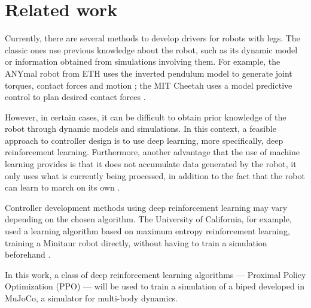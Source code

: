 






\section{Related work}

Currently, there are several methods to develop drivers for robots with legs. The classic ones use previous knowledge about the robot, such as its dynamic model or information obtained from simulations involving them. For example, the ANYmal robot from ETH uses the inverted pendulum model to generate joint torques, contact forces and motion \cite{anymal}; the MIT Cheetah uses a model predictive control to plan desired contact forces \cite{cheetah}.

However, in certain cases, it can be difficult to obtain prior knowledge of the robot through dynamic models and simulations. In this context, a feasible approach to controller design is to use deep learning, more specifically, deep reinforcement learning. Furthermore, another advantage that the use of machine learning provides is that it does not accumulate data generated by the robot, it only uses what is currently being processed, in addition to the fact that the robot can learn to march on its own \cite{haarnoja2018learning}.

Controller development methods using deep reinforcement learning may vary depending on the chosen algorithm. The University of California, for example, used a learning algorithm based on maximum entropy reinforcement learning, training a Minitaur robot directly, without having to train a simulation beforehand \cite{haarnoja2018learning}.

In this work, a class of deep reinforcement learning algorithms — Proximal Policy Optimization (PPO) — will be used to train a simulation of a biped developed in MuJoCo, a simulator for multi-body dynamics.



